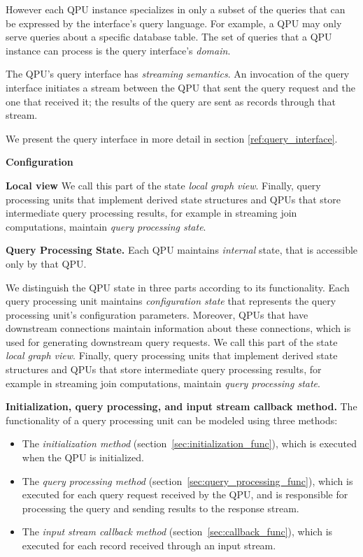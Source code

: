However each QPU instance specializes in only a subset of the queries that can be expressed by the interface's query
language.
For example, a QPU may only serve queries about a specific database table.
The set of queries that a QPU instance can process is the query interface's \textit{domain}.

The QPU's query interface has \textit{streaming semantics}.
An invocation of the query interface initiates a stream between the QPU that sent the query request and the one that
received it;
the results of the query are sent as records through that stream.

We present the query interface in more detail in section \ref{ref:query_interface}.

\medskip
\noindent
\textbf{Configuration}

\medskip
\noindent
\textbf{Local view}
We call this part of the state \textit{local graph view}.
Finally, query processing units that implement derived state structures and QPUs that store intermediate query processing
results, for example in streaming join computations, maintain \textit{query processing state}.

\medskip
\noindent
\textbf{Query Processing State.}
Each QPU maintains \textit{internal} state, that is accessible only by that QPU.

We distinguish the QPU state in three parts according to its functionality.
Each query processing unit maintains \textit{configuration state} that represents the query processing unit's
configuration parameters.
Moreover, QPUs that have downstream connections maintain information about these connections, which is
used for generating downstream query requests.
We call this part of the state \textit{local graph view}.
Finally, query processing units that implement derived state structures and QPUs that store intermediate query processing
results, for example in streaming join computations, maintain \textit{query processing state}.

\medskip
\noindent
\textbf{Initialization, query processing, and input stream callback method.}
The functionality of a query processing unit can be modeled using three methods:
\begin{itemize}
  \item The \textit{initialization method} (section~\ref{sec:initialization_func}), which is executed when the QPU is
  initialized.

  \item The \textit{query processing method} (section~\ref{sec:query_processing_func}), which is executed for each
  query request received by the QPU, and is responsible for processing the query and sending results to the response stream.

  \item The \textit{input stream callback method} (section~\ref{sec:callback_func}), which is executed for each record
  received through an input stream.

\end{itemize}

